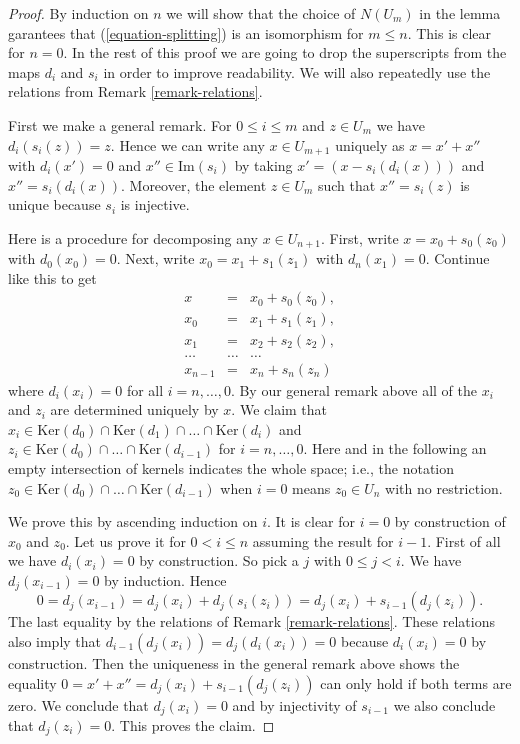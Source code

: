 \begin{proof}
By induction on $n$ we will show that the choice of $N(U_m)$
in the lemma garantees that (\ref{equation-splitting}) is
an isomorphism for $m \leq n$. This is clear for $n = 0$.
In the rest of this proof we are going to
drop the superscripts from the maps $d_i$ and $s_i$ in order
to improve readability. We will also repeatedly use the relations
from Remark \ref{remark-relations}.

\medskip\noindent
First we make a general remark.
For $0 \leq i \leq m$ and $z \in U_m$ we have
$d_i(s_i(z)) = z$. Hence we can write 
any $x \in U_{m + 1}$ uniquely as
$x = x' + x''$ with $d_i(x') = 0$
and $x'' \in \text{Im}(s_i)$
by taking $x' = (x - s_i(d_i(x)))$ and
$x'' = s_i(d_i(x))$. Moreover, the element
$z \in U_m$ such that $x'' = s_i(z)$
is unique because $s_i$ is injective.

\medskip\noindent
Here is a procedure for decomposing
any $x \in U_{n + 1}$.
First, write $x = x_0 + s_0(z_0)$ with $d_0(x_0) = 0$.
Next, write $x_0 = x_1 + s_1(z_1)$ with
$d_n(x_1) = 0$. Continue like this to get
\begin{eqnarray*}
x & = & x_0 + s_0(z_0), \\
x_0 & = & x_1 + s_1(z_1), \\
x_1 & = & x_2 + s_2(z_2), \\
\ldots & \ldots & \ldots \\
x_{n - 1} & = & x_n + s_n(z_n)
\end{eqnarray*}
where $d_i(x_i) = 0$ for all $i = n, \ldots, 0$.
By our general remark above all of the $x_i$
and $z_i$ are determined uniquely by $x$.
We claim that
$x_i \in
\text{Ker}(d_0) \cap
\text{Ker}(d_1) \cap
\ldots \cap
\text{Ker}(d_i)$
and
$z_i \in
\text{Ker}(d_0) \cap
\ldots \cap
\text{Ker}(d_{i - 1})$
for $i = n, \ldots, 0$.
Here and in the following
an empty intersection of kernels indicates
the whole space; i.e.,
the notation
$z_0 \in \text{Ker}(d_0) \cap
\ldots \cap
\text{Ker}(d_{i - 1})$
when $i = 0$ means $z_0 \in U_n$ with no restriction.

\medskip\noindent
We prove this by ascending induction on $i$.
It is clear for $i = 0$ by construction of $x_0$ and $z_0$.
Let us prove it for $0 < i \leq n$ assuming the result for $i - 1$.
First of all we have $d_i(x_i) = 0$ by construction.
So pick a $j$ with $0 \leq j < i$. We have
$d_j(x_{i - 1}) = 0$ by induction. Hence
$$
0 = d_j(x_{i - 1})
= d_j(x_i) + d_j(s_i(z_i))
= d_j(x_i) + s_{i - 1}(d_j(z_i)).
$$
The last equality by the relations of Remark \ref{remark-relations}.
These relations also imply that
$d_{i - 1}(d_j(x_i)) = d_j(d_i(x_i)) = 0$
because $d_i(x_i)= 0$ by construction.
Then the uniqueness in the general remark above shows the equality
$0 = x' + x'' = d_j(x_i) + s_{i - 1}(d_j(z_i))$
can only hold if both terms are zero. We conclude that
$d_j(x_i) = 0$ and by injectivity of $s_{i - 1}$ we also
conclude that $d_j(z_i) = 0$. This proves the claim.


\end{proof}

